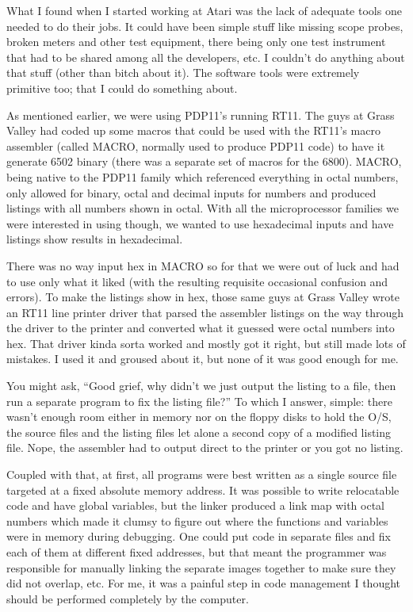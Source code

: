 What I found when I started working at Atari was the lack of adequate tools one needed to do their jobs. It could have been simple stuff like missing scope probes, broken meters and other test equipment, there being only one test instrument that had to be shared among all the developers, etc. I couldn't do anything about that stuff (other than bitch about it). The software tools were extremely primitive too; that I could do something about. 

As mentioned earlier, we were using PDP11's running RT11. The guys at Grass Valley had coded up some macros that could be used with the RT11's macro assembler (called MACRO, normally used to produce PDP11 code) to have it generate 6502 binary (there was a separate set of macros for the 6800). MACRO, being native to the PDP11 family which referenced everything in octal numbers, only allowed for binary, octal and decimal inputs for numbers and produced listings with all numbers shown in octal. With all the microprocessor families we were interested in using though, we wanted to use hexadecimal inputs and have listings show results in hexadecimal. 

There was no way input hex in MACRO so for that we were out of luck and had to use only what it liked (with the resulting requisite occasional confusion and errors). To make the listings show in hex, those same guys at Grass Valley wrote an RT11 line printer driver that parsed the assembler listings on the way through the driver to the printer and converted what it guessed were octal numbers into hex. That driver kinda sorta worked and mostly got it right, but still made lots of mistakes. I used it and groused about it, but none of it was good enough for me. 

You might ask, “Good grief, why didn't we just output the listing to a file, then run a separate program to fix the listing file?” To which I answer, simple: there wasn't enough room either in memory nor on the floppy disks to hold the O/S, the source files and the listing files let alone a second copy of a modified listing file. Nope, the assembler had to output direct to the printer or you got no listing. 

Coupled with that, at first, all programs were best written as a single source file targeted at a fixed absolute memory address. It was possible to write relocatable code and have global variables, but the linker produced a link map with octal numbers which made it clumsy to figure out where the functions and variables were in memory during debugging. One could put code in separate files and fix each of them at different fixed addresses, but that meant the programmer was responsible for manually linking the separate images together to make sure they did not overlap, etc. For me, it was a painful step in code management I thought should be performed completely by the computer.

